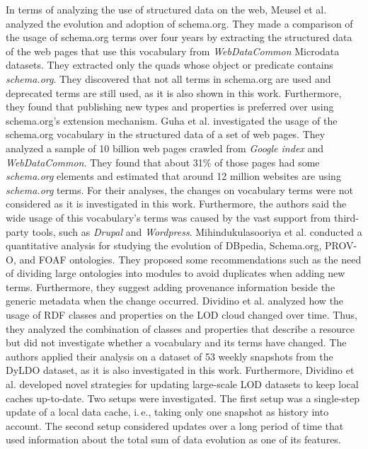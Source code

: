 In terms of analyzing the use of structured data on the web, Meusel et al. \cite{meusel2015web} analyzed the evolution and adoption of schema.org. 
They made a comparison of the usage of schema.org terms over four years by extracting the structured data of the web pages that use this vocabulary from \textit{WebDataCommon} Microdata datasets. They extracted only the quads whose  object or predicate contains \textit{schema.org}. They discovered that not all terms in schema.org are used and deprecated terms are still used, as it is also shown in this work. 
Furthermore, they found that publishing new types and properties is preferred over using schema.org's extension mechanism. 
%
Guha et al. \cite{guha2016schema} investigated the usage of the schema.org vocabulary in the structured data of a set of web pages. 
They analyzed a sample of 10 billion web pages crawled from \textit{Google index} and \textit{WebDataCommon}. 
They found that about 31\% of those pages had some \textit{schema.org} elements and estimated that around 12 million websites are using \textit{schema.org} terms. 
For their analyses, the changes on vocabulary terms were not considered as it is investigated in this work.
Furthermore, the authors said the wide usage of this vocabulary's terms was caused by the vast support from third-party tools, such as \textit{Drupal} and \textit{Wordpress}. 
Mihindukulasooriya et al. \cite{mihindukulasooriya2016collaborative} conducted a quantitative analysis for studying the evolution of DBpedia, Schema.org, PROV-O, and FOAF ontologies. They proposed some recommendations such as the need of dividing large ontologies into modules to avoid duplicates when adding new terms. Furthermore, they suggest adding  provenance information beside the generic metadata when the change occurred. 
%
%
Dividino et al. \cite{dividino2013change} analyzed how the usage of RDF classes and properties on the LOD cloud changed over time. 
Thus, they analyzed the combination of classes and properties that describe a resource but did not investigate whether a vocabulary and its terms have changed.
The authors applied their analysis on a dataset of 53 weekly snapshots from the DyLDO dataset, as it is also investigated in this work.
Furthermore, Dividino et al. \cite{dividino2015strategies} developed novel strategies for updating large-scale LOD datasets to keep local caches up-to-date. 
Two setups were investigated. 
The first setup was a single-step update of a local data cache, i.\,e., taking only one snapshot as history into account.
The second setup considered updates over a long period of time that used information about the total sum of data evolution as one of its features. 
